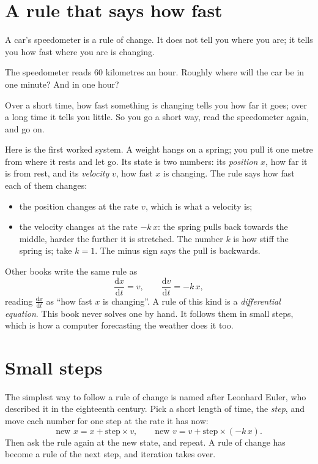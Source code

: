 \section{A rule that says how fast}
\label{sec:ch04-rates}

\noindent
A car's speedometer is a rule of change. It does not tell you where you are;
it tells you how fast where you are is changing.

\begin{think}
The speedometer reads $60$ kilometres an hour. Roughly where will the car be
in one minute? And in one hour?
\end{think}
Over a short time, how fast something is changing tells you how far it goes;
over a long time it tells you little. So you go a short way, read the
speedometer again, and go on.

Here is the first worked system. A weight hangs on a spring; you pull it one
metre from where it rests and let go. Its state is two numbers: its
\emph{position} $x$, how far it is from rest, and its \emph{velocity} $v$, how
fast $x$ is changing. The rule says how fast each of them changes:
\begin{itemize}
\item the position changes at the rate $v$, which is what a velocity is;
\item the velocity changes at the rate $-k\,x$: the spring pulls back towards
  the middle, harder the further it is stretched. The number $k$ is how stiff
  the spring is; take $k = 1$. The minus sign says the pull is backwards.
\end{itemize}
Other books write the same rule as
\[ \frac{\mathrm{d}x}{\mathrm{d}t} = v, \qquad
   \frac{\mathrm{d}v}{\mathrm{d}t} = -k\,x, \]
reading $\tfrac{\mathrm{d}x}{\mathrm{d}t}$ as \enquote{how fast $x$ is
changing}. A rule of this kind is a \emph{differential equation}. This book
never solves one by hand. It follows them in small steps, which is how a
computer forecasting the weather does it too.

\section{Small steps}
\label{sec:ch04-euler}

\noindent
The simplest way to follow a rule of change is named after Leonhard Euler,
who described it in the eighteenth century. Pick a short length of time, the
\emph{step}, and move each number for one step at the rate it has now:
\[ \text{new } x = x + \text{step} \times v, \qquad
   \text{new } v = v + \text{step} \times (-k\,x). \]
Then ask the rule again at the new state, and repeat. A rule of change has
become a rule of the next step, and iteration takes over.

